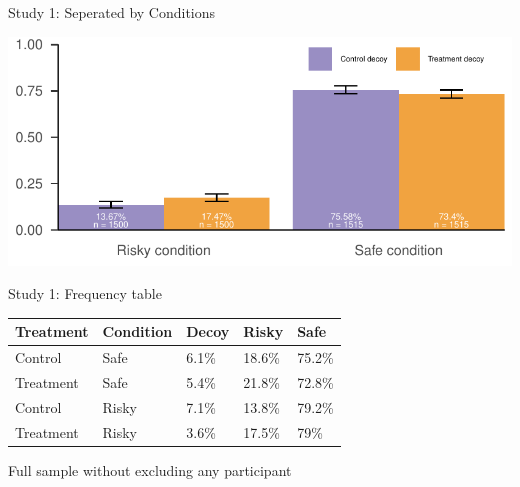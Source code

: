 \documentclass[
  ignorenonframetext,
  aspectratio=169]{beamer}
\begin{document}
\begin{frame}{Study 1: Seperated by Conditions}
\label{study-1-seperated-by-conditions}
\begin{flushright}\includegraphics{BDR_Lab_0929_files/figure-beamer/unnamed-chunk-2-1} \end{flushright}
\end{frame}

\begin{frame}{Study 1: Frequency table}
\label{study-1-frequency-table}
\begin{table}
\centering
\begin{tabular}{lllll}
\toprule
Treatment & Condition & Decoy & Risky & Safe\\
\midrule
Control & Safe & 6.1\% & 18.6\% & 75.2\%\\
Treatment & Safe & 5.4\% & 21.8\% & 72.8\%\\
Control & Risky & 7.1\% & 13.8\% & 79.2\%\\
Treatment & Risky & 3.6\% & 17.5\% & 79\%\\
\bottomrule
\end{tabular}
\end{table}

\vfill

\hfill \tiny *Full sample without excluding any participant
\end{frame}
\end{document}
